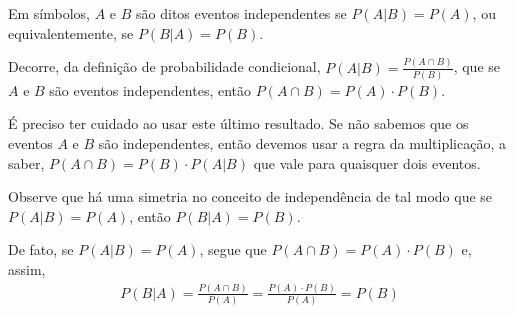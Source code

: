 Em símbolos, \(A\) e \(B\)  são ditos eventos independentes se \(P(A|B)=P(A)\), ou equivalentemente, se \(P(B|A)=P(B)\).

Decorre, da definição de probabilidade condicional,
\(P(A|B)=\displaystyle\frac{P(A\cap B)}{P(B)}\), que se \(A\) e \(B\)
são eventos independentes, então \(P(A\cap B)=P(A) \cdot P(B)\).

É preciso ter cuidado ao usar este último resultado. Se não sabemos que os eventos \(A\) e \(B\) são independentes, então devemos usar a regra da multiplicação, a saber, \(P(A\cap B)=P(B)\cdot P(A|B)\) que vale para quaisquer dois eventos.

Observe que há uma simetria no conceito de independência de tal modo que se
\(P(A|B)=P(A)\), então \(P(B|A)=P(B)\).

De fato, se \(P(A|B)=P(A)\), segue que \(P(A\cap B)=P(A) \cdot P(B)\) e, assim,
\begin{equation*}
\begin{split}P(B|A)=\frac{P(A\cap B)}{P(A)}=\frac{P(A)\cdot P(B)}{P(A)}=P(B)\end{split}
\end{equation*}
